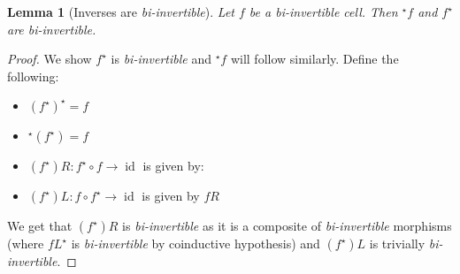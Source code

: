 \documentclass{article}
\newtheorem{lemma}{Lemma}
\theoremstyle{definition}
\theoremstyle{examplestyle}
\DeclareMathOperator{\id}{id}
\newcommand{\linv}[1]{{}^\star\!#1}
\newcommand{\rinv}[1]{#1^\star}
\begin{document}
\begin{lemma}[Inverses are \emph{bi-invertible}]
  \label{lem:inverses}
  Let \(f\) be a \emph{bi-invertible} cell. Then \(\linv f\) and \(\rinv f\) are \emph{bi-invertible}.
\end{lemma}
\begin{proof}
  We show \(\rinv f\) is \emph{bi-invertible} and \(\linv f\) will follow similarly. Define the following:
  \begin{itemize}
  \item \(\rinv {(\rinv f)} = f\)
  \item \(\linv {(\rinv f)} = f\)
  \item \((\rinv f)R: \rinv f \circ f \to \id\) is given by:
    \begin{center}
    \end{center}
  \item \((\rinv f)L: f \circ \rinv f \to \id\) is given by \(fR\)
  \end{itemize}
  We get that \((\rinv f)R\) is \emph{bi-invertible} as it is a composite of \emph{bi-invertible} morphisms (where \(\rinv {fL}\) is \emph{bi-invertible} by coinductive hypothesis) and \((\rinv f)L\) is trivially \emph{bi-invertible}.
\end{proof}
\end{document}
